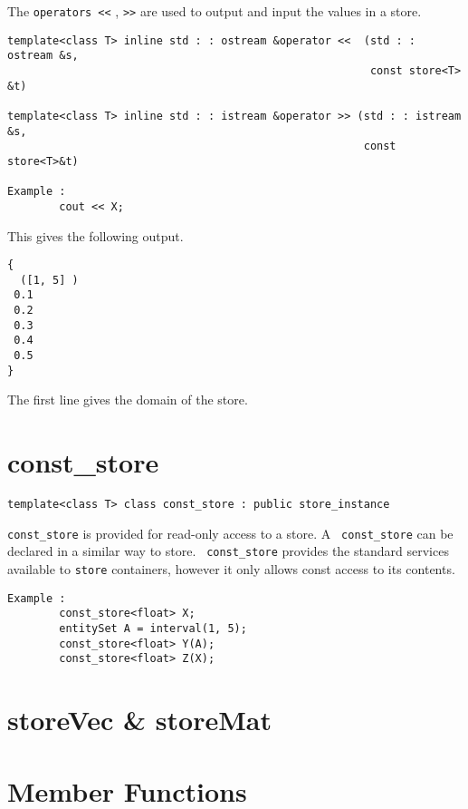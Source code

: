 \documentclass[letterpaper,12pt]{article}
\begin{document}
The {\tt operators <<} , {\tt >>} are used to output and input the
values in a store.

\begin{verbatim}
template<class T> inline std : : ostream &operator <<  (std : : ostream &s, 
                                                        const store<T> &t)

template<class T> inline std : : istream &operator >> (std : : istream &s, 
                                                       const store<T>&t)

Example : 
        cout << X;
\end{verbatim}

This gives the following output.
\begin{verbatim}
{
  ([1, 5] ) 
 0.1
 0.2
 0.3
 0.4
 0.5
}       
\end{verbatim}

The first line gives the domain of the store.

\section*{const\_store}

\begin{verbatim}
template<class T> class const_store : public store_instance
\end{verbatim}


{\tt const\_store} is provided for read-only access to a store.  A {\tt
const\_store} can be declared in a similar way to store. {\tt
const\_store} provides the standard services available to {\tt store}
containers, however it only allows const access to its contents.

\begin{verbatim}
Example : 
        const_store<float> X;
        entitySet A = interval(1, 5);
        const_store<float> Y(A);
        const_store<float> Z(X);
\end{verbatim}



\section{storeVec \& storeMat}

\section*{Member Functions}
\end{document}
